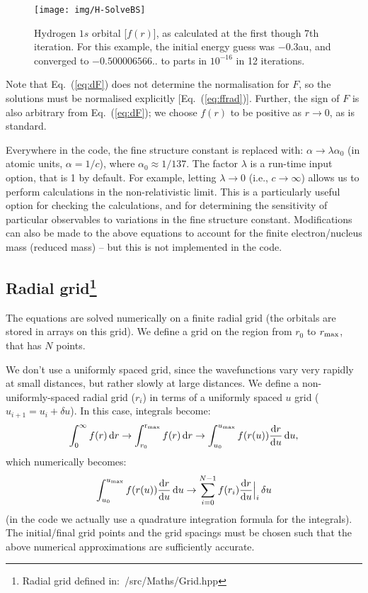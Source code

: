 \documentclass[10pt,twocolumn,a4paper]{article}%
\newcommand{\be}{\begin{equation}}
\newcommand{\ee}{\end{equation}}
\def\d{\ensuremath{{\rm d}}}
\begin{document}
\begin{figure}
\centering
\texttt{[image: img/H-SolveBS]}
\caption{\small Hydrogen $1s$ orbital [$f(r)$], as calculated at the first though 7th iteration. 
For this example, the initial energy guess was $-0.3$au, and converged to $-0.500006566..$ to parts in $10^{-16}$ in 12 iterations.\label{fig:H-SolveBS}}
\end{figure}





Note that Eq.~(\ref{eq:dF}) does not determine the normalisation for $F$, so the solutions must be normalised explicitly [Eq.~(\ref{eq:ffrad})].
Further, the sign of $F$ is also arbitrary from Eq.~(\ref{eq:dF}); we choose $f(r)$ to be positive as $r\to 0$, as is standard.


Everywhere in the code, the fine structure constant is replaced with: $\alpha\to\lambda \alpha_0$ (in atomic units, $\alpha=1/c$), where $\alpha_0\approx1/137$.
The factor $\lambda$ is a run-time input option, that is 1 by default. 
For example, letting $\lambda\to0$ (i.e., $c\to\infty$) allows us to perform calculations in the non-relativistic limit.
This is a particularly useful option for checking the calculations, and for determining the sensitivity of particular observables to variations in the fine structure constant.
Modifications can also be made to the above equations to account for the finite electron/nucleus mass (reduced mass) -- but this is not implemented in the code.





\subsection[Radial grid]{Radial grid\label{sec:grid}\footnote{Radial grid defined in:~/src/Maths/Grid.hpp}}

The equations are solved numerically on a finite radial grid (the orbitals are stored in arrays on this grid).
We define a grid on the region from $r_0$ to $r_{\rm max}$, that has $N$ points.

We don't use a uniformly spaced grid, since the wavefunctions vary very rapidly at small distances, but rather slowly at large distances.
We define a non-uniformly-spaced radial grid ($r_i$) in terms of a uniformly spaced $u$ grid ($u_{i+1}=u_i+\delta u$).
In this case, integrals become:
\be
\int_{0}^{\infty} f(r)\,\d r \to 
\int_{r_0}^{\rm r_{max}} f(r)\,\d r \to 
\int_{u_0}^{u_{\rm max}} f(r(u))\frac{\d r}{\d u}\,\d u,
\ee
which numerically becomes:
\be
\int_{u_0}^{u_{\rm max}} f(r(u))\frac{\d r}{\d u}\,\d u \to
\sum_{i=0}^{N-1} f(r_i)\frac{\d r}{\d u}\Big|_i\,\delta u
\ee
(in the code we actually use a quadrature integration formula for the integrals).
The initial/final grid points and the grid spacings must be chosen such that the above numerical approximations are sufficiently accurate.
\end{document}
